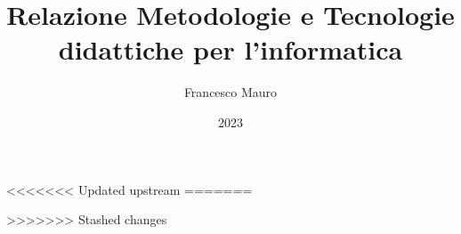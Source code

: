 \documentclass{article}
\author{Francesco Mauro}
\date{2023}
\title{Relazione Metodologie e Tecnologie didattiche per l'informatica}
\begin{document}
\maketitle
\tableofcontents

<<<<<<< Updated upstream
=======



>>>>>>> Stashed changes




\end{document}
